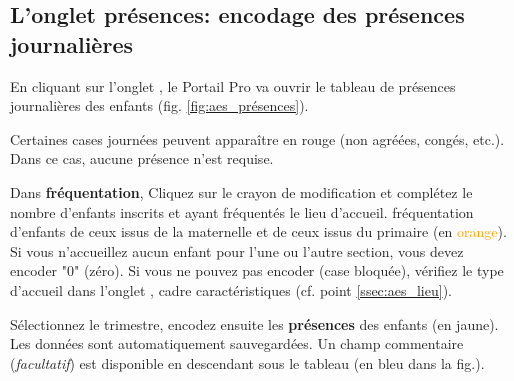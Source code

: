


\subsection{L'onglet présences: encodage des présences journalières}
En cliquant sur l'onglet , le Portail Pro va ouvrir le tableau de présences journalières des enfants (fig. \ref{fig:aes_présences}). 

Certaines cases journées peuvent apparaître en rouge (non agréées, congés, etc.). Dans ce cas, aucune présence n'est requise. 

Dans \textbf{fréquentation}, Cliquez sur le crayon de modification et complétez le nombre d'enfants inscrits et ayant fréquentés le lieu d'accueil. fréquentation d'enfants de ceux issus de la maternelle et de ceux issus du primaire (en \textcolor{orange}{orange}). Si vous n'accueillez aucun enfant pour l'une ou l'autre section, vous devez encoder "0" (zéro). Si vous ne pouvez pas encoder (case bloquée), vérifiez le type d'accueil dans l'onglet , cadre caractéristiques (cf. point \ref{ssec:aes_lieu}). 

Sélectionnez le trimestre, encodez ensuite les \textbf{présences} des enfants (en {jaune}). Les données sont automatiquement sauvegardées. Un champ commentaire (\textit{facultatif}) est disponible en descendant sous le tableau (en \textcolor{bleu}{bleu} dans la fig.). 




